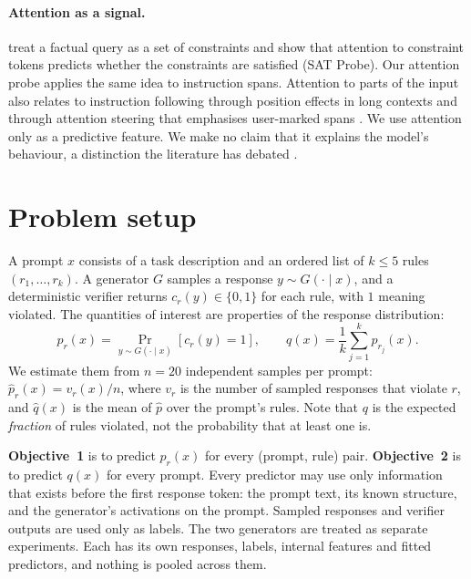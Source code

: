 \documentclass[10pt]{article}
\newcommand{\phat}{\hat{p}}
\newcommand{\qhat}{\hat{q}}
\begin{document}
\paragraph{Attention as a signal.} \citet{yuksekgonul2024attention} treat a factual query as a set of constraints and
show that attention to constraint tokens predicts whether the constraints are satisfied (SAT Probe). Our attention
probe applies the same idea to instruction spans. Attention to parts of the input also relates to instruction following
through position effects in long contexts \citep{liu2024lost} and through attention steering that emphasises
user-marked spans \citep{zhang2024pasta}. We use attention only as a predictive feature. We make no claim that it
explains the model's behaviour, a distinction the literature has debated \citep{jain2019attention,wiegreffe2019attention}.

\section{Problem setup}
\label{sec:setup}

A prompt $x$ consists of a task description and an ordered list of $k \le 5$ rules $(r_1,\dots,r_k)$. A generator $G$
samples a response $y \sim G(\cdot \mid x)$, and a deterministic verifier returns $c_r(y)\in\{0,1\}$ for each rule, with
$1$ meaning violated. The quantities of interest are properties of the response distribution:
\[
p_r(x) = \Pr_{y\sim G(\cdot\mid x)}\!\left[c_r(y)=1\right], \qquad q(x) = \frac{1}{k}\sum_{j=1}^{k} p_{r_j}(x).
\]
We estimate them from $n=20$ independent samples per prompt: $\phat_r(x) = v_r(x)/n$, where $v_r$ is the number of
sampled responses that violate $r$, and $\qhat(x)$ is the mean of $\phat$ over the prompt's rules. Note that $q$ is the
expected \emph{fraction} of rules violated, not the probability that at least one is.

\textbf{Objective~1} is to predict $p_r(x)$ for every (prompt, rule) pair. \textbf{Objective~2} is to predict $q(x)$
for every prompt. Every predictor may use only information that exists before the first response token: the prompt
text, its known structure, and the generator's activations on the prompt. Sampled responses and verifier outputs are
used only as labels. The two generators are treated as separate experiments. Each has its own responses, labels,
internal features and fitted predictors, and nothing is pooled across them.
\end{document}
